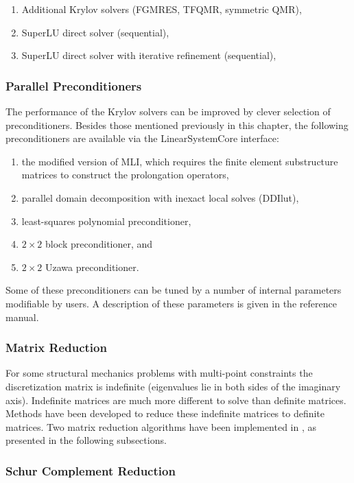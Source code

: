 \begin{enumerate}
\item Additional Krylov solvers (FGMRES, TFQMR, symmetric QMR),
\item SuperLU direct solver (sequential),
\item SuperLU direct solver with iterative refinement (sequential), 
\end{enumerate}

\subsubsection{Parallel Preconditioners} 

The performance of the Krylov solvers can be improved by clever selection
of preconditioners. Besides those mentioned previously
in this chapter, the following preconditioners are
available via the {\sf LinearSystemCore} interface: 

\begin{enumerate}
\item the modified version of MLI, which requires the finite element substructure matrices
to construct the prolongation operators,
\item parallel domain decomposition with inexact local solves ({\sf DDIlut}), 
\item least-squares polynomial preconditioner,
\item $2 \times 2$ block preconditioner, and
\item $2 \times 2$ Uzawa preconditioner.
\end{enumerate}

Some of these preconditioners can be tuned by a number of internal parameters
modifiable by users. A description of these parameters is given in the reference manual.

\subsubsection{Matrix Reduction} 

For some structural mechanics problems with multi-point constraints the 
discretization matrix is indefinite (eigenvalues lie in both sides of
the imaginary axis). Indefinite matrices are much more different to solve
than definite matrices. Methods have been developed to reduce these
indefinite matrices to definite matrices.  Two matrix reduction algorithms
have been implemented in \hypre{}, as presented in the following subsections.

\subsubsection{Schur Complement Reduction}

